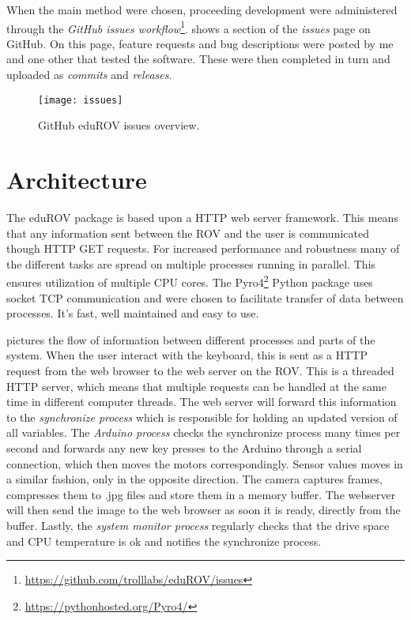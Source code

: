 When the main method were chosen, proceeding development were administered through the \emph{GitHub issues workflow}\footnote{\url{https://github.com/trolllabs/eduROV/issues}}.  shows a section of the \emph{issues} page on GitHub. On this page, feature requests and bug descriptions were posted by me and one other that tested the software. These were then completed in turn and uploaded as \textit{commits} and \textit{releases}.

\begin{figure}[h!]
    \centering
    \texttt{[image: issues]}
    \caption{GitHub eduROV issues overview.}
    \label{issues}
\end{figure}

\section{Architecture}

The eduROV package is based upon a HTTP web server framework. This means that any information sent between the ROV and the user is communicated though HTTP GET requests. For increased performance and robustness many of the different tasks are spread on multiple processes running in parallel. This ensures utilization of multiple CPU cores. The Pyro4\footnote{\url{https://pythonhosted.org/Pyro4/}} Python package uses socket TCP communication and were chosen to facilitate transfer of data between processes. It's fast, well maintained and easy to use.

 pictures the flow of information between different processes and parts of the system. When the user interact with the keyboard, this is sent as a HTTP request from the web browser to the web server on the ROV. This is a threaded HTTP server, which means that multiple requests can be handled at the same time in different computer threads. The web server will forward this information to the \textit{synchronize process} which is responsible for holding an updated version of all variables. The \textit{Arduino process} checks the synchronize process many times per second and forwards any new key presses to the Arduino through a serial connection, which then moves the motors correspondingly. Sensor values moves in a similar fashion, only in the opposite direction. The camera captures frames, compresses them to .jpg files and store them in a memory buffer. The webserver will then send the image to the web browser as soon it is ready, directly from the buffer. Lastly, the \textit{system monitor process} regularly checks that the drive space and CPU temperature is ok and notifies the synchronize process.


